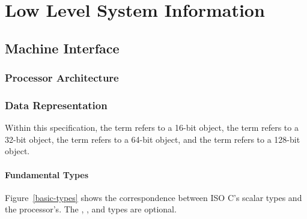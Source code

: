 \chapter{Low Level System Information}

\section{Machine Interface}

\subsection{Processor Architecture}

\subsection{Data Representation}

Within this specification, the term \emph{} refers
to a 16-bit object, the term \emph{} refers to a
32-bit object, the term \emph{} refers to a
64-bit object, and the term \emph{} refers to a
128-bit object.

\subsubsection{Fundamental Types}

Figure~\ref{basic-types} shows the correspondence between ISO C's
scalar types and the processor's. The ,
,  and  types are optional.

